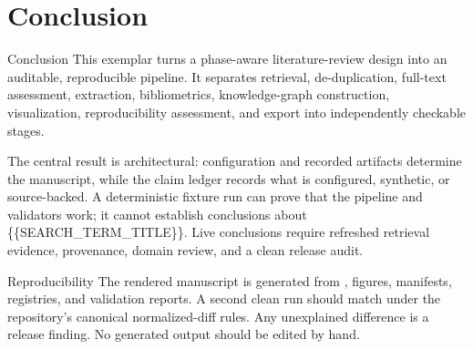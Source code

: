 \documentclass[
  ignorenonframetext,
]{beamer}
\author{}
\date{}
\begin{document}
\section{Conclusion}\label{conclusion}

\begin{frame}[allowframebreaks]{Conclusion}
This exemplar turns a phase-aware literature-review design into an
auditable, reproducible pipeline. It separates retrieval,
de-duplication, full-text assessment, extraction, bibliometrics,
knowledge-graph construction, visualization, reproducibility assessment,
and export into independently checkable stages.

The central result is architectural: configuration and recorded
artifacts determine the manuscript, while the claim ledger records what
is configured, synthetic, or source-backed. A deterministic fixture run
can prove that the pipeline and validators work; it cannot establish
conclusions about \{\{SEARCH\_TERM\_TITLE\}\}. Live conclusions require
refreshed retrieval evidence, provenance, domain review, and a clean
release audit.
\end{frame}

\begin{frame}{Reproducibility}
\label{reproducibility}
The rendered manuscript is generated from ,
figures, manifests, registries, and validation reports. A second clean
run should match under the repository's canonical normalized-diff rules.
Any unexplained difference is a release finding. No generated output
should be edited by hand.
\end{frame}
\end{document}
